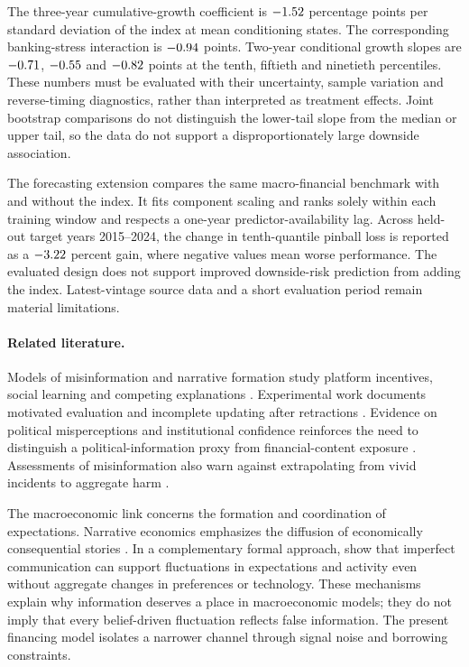 The three-year cumulative-growth coefficient is
$-1.52$ percentage points per standard deviation of the index at mean
conditioning states. The corresponding banking-stress interaction is
$-0.94$ points. Two-year conditional growth slopes are
$-0.71$, $-0.55$ and $-0.82$ points at the tenth,
fiftieth and ninetieth percentiles. These numbers must be evaluated with their
uncertainty, sample variation and reverse-timing diagnostics, rather than
interpreted as treatment effects. Joint bootstrap comparisons do not distinguish the lower-tail slope
from the median or upper tail, so the data do not support a
disproportionately large downside association.

The forecasting extension compares the same macro-financial benchmark with
and without the index. It fits component scaling and ranks solely within
each training window and respects a one-year predictor-availability lag.
Across held-out target years 2015--2024, the change in tenth-quantile pinball
loss is reported as a $-3.22$ percent gain, where negative values
mean worse performance. The evaluated design does not support improved downside-risk
prediction from adding the index. Latest-vintage source data and a
short evaluation period remain material limitations.

\paragraph{Related literature.}
Models of misinformation and narrative formation study platform incentives,
social learning and competing explanations
\citep{acemoglu2024model,muellerfrank2024weakest,eliaz2020model}.
Experimental work documents motivated evaluation and incomplete updating after
retractions \citep{thaler2024fake,goncalves2026retractions}. Evidence on
political misperceptions and institutional confidence reinforces the need to
distinguish a political-information proxy from financial-content exposure
\citep{cariolle2024misinformation,guriev20213g,zhuravskaya2020political}.
Assessments of misinformation also warn against extrapolating from vivid
incidents to aggregate harm \citep{budak2024misunderstanding,altay2023misinformation}.

The macroeconomic link concerns the formation and coordination of expectations.
Narrative economics emphasizes the diffusion of economically consequential
stories \citep{shiller2017narrative,shiller2019narrative}. In a complementary
formal approach, \citet{angeletos2013sentiments} show that imperfect
communication can support fluctuations in expectations and activity even
without aggregate changes in preferences or technology. These mechanisms
explain why information deserves a place in macroeconomic models; they do
not imply that every belief-driven fluctuation reflects false information.
The present financing model isolates a narrower channel through signal noise
and borrowing constraints.

